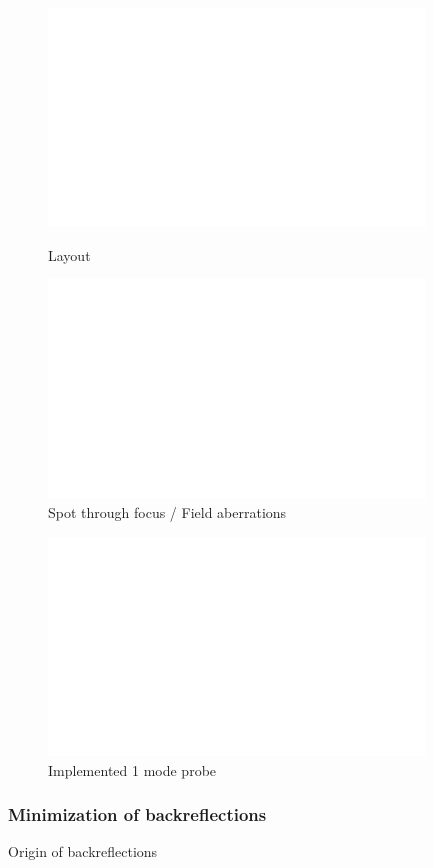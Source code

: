\begin{figure}[h!]\centering \includegraphics[width=10cm,draft]{figures/foo.png}
      \caption{Layout}

 \includegraphics[width=10cm,draft]{figures/foo.png}
      \caption{Spot through focus / Field aberrations}
\end{figure}

\begin{figure}[h!]\centering \includegraphics[width=10cm,draft]{figures/foo.png}
      \caption{Implemented 1 mode probe}
\end{figure}


\subsubsection{Minimization of backreflections}
Origin of backreflections

